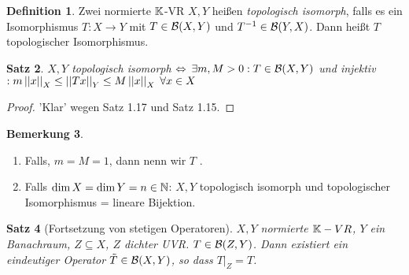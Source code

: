 \documentclass[ngerman]{report}
\theoremstyle{plain}%
\newtheorem{thm}{Satz}[chapter]
\theoremstyle{definition}%
\newtheorem{definition}[thm]{Definition}
\theoremstyle{myStyle}
\newtheorem{bem}[thm]{Bemerkung}
\begin{document}
	\begin{definition}
		Zwei normierte $\mathbb{K}$-VR $X,Y$ heißen \textit{topologisch isomorph}, falls es ein Isomorphismus 
		$T: X\to Y$ mit $T\in \BS$ und $T^{-1}\in\mathcal{B}(Y,X)$. Dann heißt $T$ topologischer Isomorphismus.
	\end{definition}

	\begin{thm}
		$X, Y$ topologisch isomorph $\overset{}{\Leftrightarrow}$ $\exists m,M > 0: T\in \BS$ und injektiv
		$: m\left\lvert \left\lvert x \right\rvert \right\rvert_X \leq \left\lvert \left\lvert Tx \right\rvert \right\rvert_Y \leq M \left\lvert \left\lvert x \right\rvert \right\rvert_X \; \forall x\in X$
	\end{thm}
	\begin{proof}
		'Klar' wegen Satz 1.17 und Satz 1.15.
	\end{proof}
	
	\begin{bem}
		\begin{enumerate}
			\item Falls, $m=M=1$, dann nenn wir $T$ .
			\item Falls $\dim X = \dim Y = n\in \mathbb{N}$: $X,Y$ topologisch isomorph und topologischer Isomorphismus = lineare Bijektion.
		\end{enumerate}
	\end{bem}
	
	\begin{thm}[Fortsetzung von stetigen Operatoren]
		$X,Y$ normierte $\mathbb{K}-VR$, $Y$ ein Banachraum, $Z\subseteq X$, $Z$ dichter UVR.
		$T\in \mathcal{B}(Z,Y)$. Dann existiert ein eindeutiger Operator $\tilde{T} \in \BS$, so dass
		$T|_Z = T$.
	\end{thm}
\end{document}
